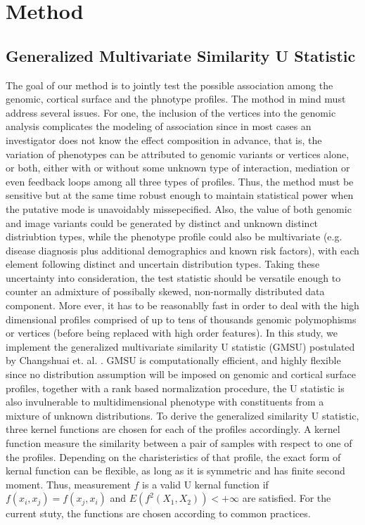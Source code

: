 \section{Method}

\subsection{Generalized Multivariate Similarity U Statistic}
The goal of our method is to jointly test the possible association among the genomic, cortical surface and the phnotype profiles. The mothod in mind must address several issues. For one, the inclusion of the vertices into the genomic analysis complicates the modeling of association since in most cases an investigator does not know the effect composition in advance, that is, the variation of phenotypes can be attributed to genomic variants or vertices alone, or both, either with or without some unknown type of interaction, mediation or even feedback loops among all three types of profiles. Thus, the method must be sensitive but at the same time robust enough to maintain statistical power when the putative mode is unavoidably missepecified. Also, the value of both genomic and image variants could be generated by distinct and unknown distinct distriubtion types, while the phenotype profile could also be multivariate (e.g. disease diagnosis plus additional demographics and known risk factors), with each element following distinct and uncertain distribution types. Taking these uncertainty into consideration, the test statistic should be versatile enough to counter an admixture of possibally skewed, non-normally distributed data component. More ever, it has to be reasonablly fast in order to deal with the high dimensional profiles comprised of up to tens of thousands genomic polymophisms or vertices (before being replaced with high order features). In this study, we implement the generalized multivariate similarity U statistic (GMSU) postulated by Changshuai et. al. \cite{HWU}. GMSU is computationally efficient, and highly flexible since no distribution assumption will be imposed on genomic and cortical surface profiles, together with a rank based normalization procedure, the U statistic is also invulnerable to multidimensional phenotype with constituents from a mixture of unknown distributions.
To derive the generalized similarity U statistic, three kernel functions are chosen for each of the profiles accordingly. A kernel function measure the similarity between a pair of samples with respect to one of the profiles. Depending on the charisteristics of that profile, the exact form of kernal function can be flexible, as long as it is symmetric and has finite second moment. Thus, measurement $f$ is a valid U kernal function if $f(x_i,x_j)=f(x_j,x_i)$ and $E(f^2(X_1, X_2))<+\infty$ are satisfied. For the current stuty, the functions are chosen according to common practices.

